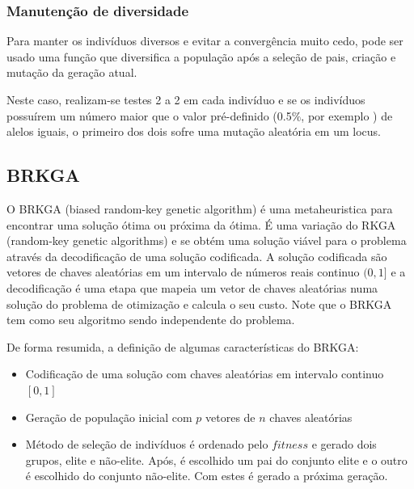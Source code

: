 \documentclass[conference]{IEEEtran}
\begin{document}
    \subsubsection{Manutenção de diversidade}

        Para manter os indivíduos diversos e evitar a convergência muito cedo, pode ser usado uma função que diversifica a população após a seleção de pais, criação e mutação da geração atual.

        Neste caso, realizam-se testes 2 a 2 em cada indivíduo e se os indivíduos possuírem um número maior que o valor pré-definido (0.5$\%$, por exemplo ) de alelos iguais, o primeiro dos
        dois sofre uma mutação aleatória em um locus.


\subsection{BRKGA}
\label{sec:alg_genetic}

    O BRKGA (biased random-key genetic algorithm)\cite{gonccalves2011biased} é uma metaheuristica para encontrar uma solução ótima ou próxima da ótima. É uma variação do RKGA
    (random-key genetic algorithms) \cite{bean1994genetic} e se obtém uma solução viável para o problema através da decodificação de uma solução codificada. A solução codificada são vetores de
    chaves aleatórias em um intervalo de números reais continuo $(0,1]$ e a decodificação é uma etapa que mapeia um vetor de chaves aleatórias numa solução do problema de otimização e calcula o
    seu custo. Note que o BRKGA tem como seu algoritmo sendo independente do problema. 

    De forma resumida, a definição de algumas características do BRKGA: 


        \begin{itemize}

        \item Codificação de uma solução com chaves aleatórias em intervalo continuo $[0,1]$ 

        \item Geração de população inicial com $p$ vetores de $n$ chaves aleatórias

        \item Método de seleção de indivíduos é ordenado pelo $fitness$ e gerado dois grupos, elite e não-elite. Após, é escolhido um pai do conjunto elite e o outro é escolhido do conjunto
            não-elite. Com estes é gerado a próxima geração. 

        \end{itemize}
\end{document}
